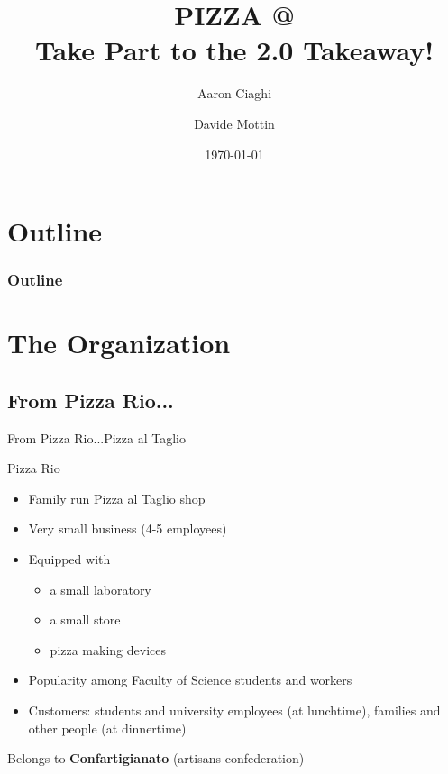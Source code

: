 \documentclass{beamer}
\title{PIZZA @\\Take Part to the 2.0 Takeaway!}
\author{Aaron Ciaghi \and Davide Mottin}
\institute{Universit\`{a} degli Studi di Trento}
\date{\today}
\begin{document}

\begin{frame}
 \titlepage
\end{frame}

\section*{Outline}
\begin{frame}
 \frametitle{Outline}
 \tableofcontents
\end{frame}

\section{The Organization}
\subsection{From Pizza Rio...}
\begin{frame}{From Pizza Rio...}{Pizza al Taglio}
 \begin{block}{Pizza Rio}
  \begin{itemize}
   \item Family run Pizza al Taglio shop
   \item Very small business (4-5 employees)
   \item Equipped with
   \begin{itemize}
    \item a small laboratory
    \item a small store
    \item pizza making devices
   \end{itemize}
   \item Popularity among Faculty of Science students and workers
   \item Customers: students and university employees (at lunchtime), families and other people (at dinnertime)
  \end{itemize}
  \begin{center}
   Belongs to \textbf{Confartigianato} (artisans confederation)
  \end{center}
 \end{block}
\end{frame}
\end{document}

